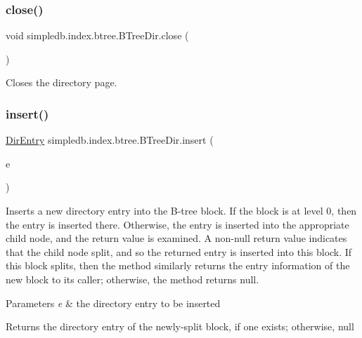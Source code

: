 \subsubsection{\texorpdfstring{close()}{close()}}
{\footnotesize\ttfamily void simpledb.\+index.\+btree.\+B\+Tree\+Dir.\+close (\begin{DoxyParamCaption}{ }\end{DoxyParamCaption})\hspace{0.3cm}{\ttfamily [inline]}}

Closes the directory page. \mbox{\label{classsimpledb_1_1index_1_1btree_1_1BTreeDir_afa780e1626a87518225351bc875b01ec}} 
\subsubsection{\texorpdfstring{insert()}{insert()}}
{\footnotesize\ttfamily \hyperlink{classsimpledb_1_1index_1_1btree_1_1DirEntry}{Dir\+Entry} simpledb.\+index.\+btree.\+B\+Tree\+Dir.\+insert (\begin{DoxyParamCaption}\item[{\hyperlink{classsimpledb_1_1index_1_1btree_1_1DirEntry}{Dir\+Entry}}]{e }\end{DoxyParamCaption})\hspace{0.3cm}{\ttfamily [inline]}}

Inserts a new directory entry into the B-\/tree block. If the block is at level 0, then the entry is inserted there. Otherwise, the entry is inserted into the appropriate child node, and the return value is examined. A non-\/null return value indicates that the child node split, and so the returned entry is inserted into this block. If this block splits, then the method similarly returns the entry information of the new block to its caller; otherwise, the method returns null. 
\begin{DoxyParams}{Parameters}
{\em e} & the directory entry to be inserted \\
\hline
\end{DoxyParams}
\begin{DoxyReturn}{Returns}
the directory entry of the newly-\/split block, if one exists; otherwise, null 
\end{DoxyReturn}
\mbox{\label{classsimpledb_1_1index_1_1btree_1_1BTreeDir_ac06e5a1031dc5ce29f911b8473ee058b}} 
